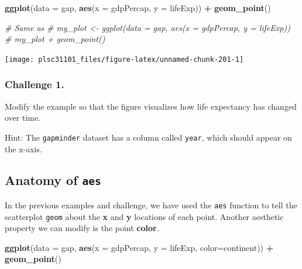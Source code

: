 \documentclass[
]{book}
\newenvironment{Shaded}{\begin{snugshade}}{\end{snugshade}}
\newcommand{\CommentTok}[1]{\textcolor[rgb]{0.56,0.35,0.01}{\textit{#1}}}
\newcommand{\DataTypeTok}[1]{\textcolor[rgb]{0.13,0.29,0.53}{#1}}
\newcommand{\KeywordTok}[1]{\textcolor[rgb]{0.13,0.29,0.53}{\textbf{#1}}}
\newcommand{\NormalTok}[1]{#1}
\newcommand{\OperatorTok}[1]{\textcolor[rgb]{0.81,0.36,0.00}{\textbf{#1}}}
\newcommand{\StringTok}[1]{\textcolor[rgb]{0.31,0.60,0.02}{#1}}
\begin{document}
\begin{Shaded}
\begin{Highlighting}[]
\KeywordTok{ggplot}\NormalTok{(}\DataTypeTok{data =}\NormalTok{ gap, }\KeywordTok{aes}\NormalTok{(}\DataTypeTok{x =}\NormalTok{ gdpPercap, }\DataTypeTok{y =}\NormalTok{ lifeExp)) }\OperatorTok{+}\StringTok{ }
\StringTok{  }\KeywordTok{geom_point}\NormalTok{()}

\CommentTok{# Same as}
\CommentTok{# my_plot <- ggplot(data = gap, aes(x = gdpPercap, y = lifeExp))}
\CommentTok{# my_plot + geom_point()}
\end{Highlighting}
\end{Shaded}

\begin{center}\texttt{[image: plsc31101\_files/figure-latex/unnamed-chunk-201-1]} \end{center}

\hypertarget{challenge-1.-6}{%
\subsubsection*{Challenge 1.}\label{challenge-1.-6}}

Modify the example so that the figure visualizes how life expectancy has changed over time.

Hint: The \texttt{gapminder} dataset has a column called \texttt{year}, which should appear on the x-axis.

\hypertarget{anatomy-of-aes}{%
\subsection{\texorpdfstring{Anatomy of \texttt{aes}}{Anatomy of aes}}\label{anatomy-of-aes}}

In the previous examples and challenge, we have used the \texttt{aes} function to tell the scatterplot \texttt{geom} about the \textbf{x} and \textbf{y} locations of each point. Another aesthetic property we can modify is the point \textbf{color}.

\begin{Shaded}
\begin{Highlighting}[]
\KeywordTok{ggplot}\NormalTok{(}\DataTypeTok{data =}\NormalTok{ gap, }\KeywordTok{aes}\NormalTok{(}\DataTypeTok{x =}\NormalTok{ gdpPercap, }\DataTypeTok{y =}\NormalTok{ lifeExp, }\DataTypeTok{color=}\NormalTok{continent)) }\OperatorTok{+}\StringTok{ }
\StringTok{  }\KeywordTok{geom_point}\NormalTok{()}
\end{Highlighting}
\end{Shaded}
\end{document}
